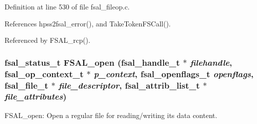 Definition at line 530 of file fsal\_\-fileop.c.

References hpss2fsal\_\-error(), and TakeTokenFSCall().

Referenced by FSAL\_\-rcp().
\subsubsection[{FSAL\_\-open}]{\setlength{\rightskip}{0pt plus 5cm}fsal\_\-status\_\-t FSAL\_\-open (fsal\_\-handle\_\-t $\ast$ {\em filehandle}, \/  fsal\_\-op\_\-context\_\-t $\ast$ {\em p\_\-context}, \/  fsal\_\-openflags\_\-t {\em openflags}, \/  fsal\_\-file\_\-t $\ast$ {\em file\_\-descriptor}, \/  fsal\_\-attrib\_\-list\_\-t $\ast$ {\em file\_\-attributes})}\label{fsal__fileop_8c_36215c66158f82d668d3986c50757b56}


FSAL\_\-open: Open a regular file for reading/writing its data content.

